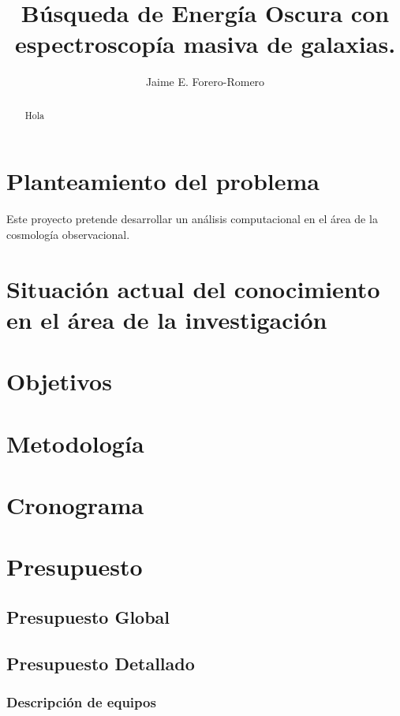 \documentclass[12pt]{article}
\title{B\'usqueda de Energ\'ia Oscura con espectroscop\'ia masiva de galaxias.}
\author{Jaime E. Forero-Romero}
\begin{document}
\maketitle
\tableofcontents

\begin{abstract}
Hola
\end{abstract}

\section{Planteamiento del problema}
Este proyecto pretende desarrollar un an\'alisis computacional en el
\'area de la cosmolog\'ia observacional. 


\section{Situación actual del conocimiento en el área de la investigación}

\section{Objetivos}

\section{Metodolog\'ia}

\section{Cronograma}

\section{Presupuesto}

\subsection{Presupuesto Global}

\subsection{Presupuesto Detallado}

\subsubsection*{Descripci\'on de equipos}
\end{document}

